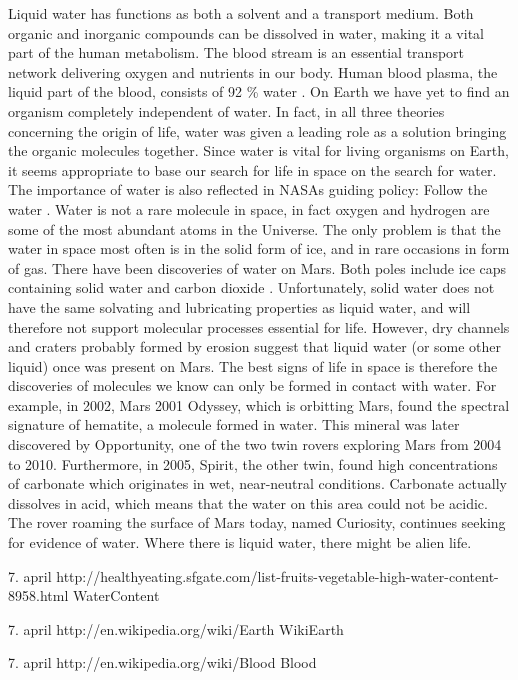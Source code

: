 Liquid water has functions as both a solvent and a transport medium. 
Both organic and inorganic compounds can be dissolved in water, making it a vital part of the human metabolism. 
The blood stream is an essential transport network delivering oxygen and nutrients in our body. 
Human blood plasma, the liquid part of the blood, consists of 92 \% water \cite{Blood}. 
On Earth we have yet to find an organism completely independent of water. 
In fact, in all three theories concerning the origin of life, water was given a leading role as a solution bringing the organic molecules together. 
Since water is vital for living organisms on Earth, it seems appropriate to base our search for life in space on the search for water.
The importance of water is also reflected in NASAs guiding policy: Follow the water \cite{NASAwater}. 
Water is not a rare molecule in space, in fact oxygen and hydrogen are some of the most abundant atoms in the Universe.
The only problem is that the water in space most often is in the solid form of ice, and in rare occasions in form of gas.
There have been discoveries of water on Mars. 
Both poles include ice caps containing solid water and carbon dioxide \cite{MARSwater}. 
Unfortunately, solid water does not have the same solvating and lubricating properties as liquid water, and will therefore not support molecular processes essential for life.
However, dry channels and craters probably formed by erosion suggest that liquid water (or some other liquid) once was present on Mars.
The best signs of life in space is therefore the discoveries of molecules we know can only be formed in contact with water.
For example, in 2002, Mars 2001 Odyssey, which is orbitting Mars, found the spectral signature of hematite, a molecule formed in water. 
This mineral was later discovered by Opportunity, one of the two twin rovers exploring Mars from 2004 to 2010.
Furthermore, in 2005, Spirit, the other twin, found high concentrations of carbonate which originates in wet, near-neutral conditions. 
Carbonate actually dissolves in acid, which means that the water on this area could not be acidic.
The rover roaming the surface of Mars today, named Curiosity, continues seeking for evidence of water. 
Where there is liquid water, there might be alien life. 


7. april http://healthyeating.sfgate.com/list-fruits-vegetable-high-water-content-8958.html WaterContent

7. april http://en.wikipedia.org/wiki/Earth WikiEarth

7. april http://en.wikipedia.org/wiki/Blood Blood

